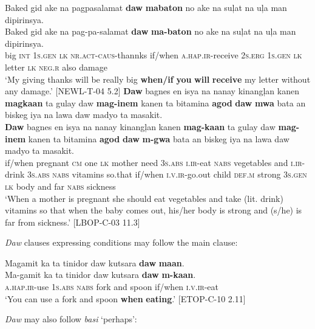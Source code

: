\ea
Baked  gid  ake  na  pagpasalamat  \textbf{daw}  \textbf{mabaton} no  ake  na  suļat  na  uļa  man  dipirinsya. \smallskip\\
\gll Baked  gid  ake  na  pag-pa-salamat  \textbf{daw}  \textbf{ma-baton} no  ake  na  suļat  na  uļa  man  dipirinsya. \\
big  \textsc{int}  1\textsc{s.gen}  \textsc{lk}  \textsc{nr.act}-\textsc{caus}-thannks  if/when  \textsc{a.hap.ir}-receive
2\textsc{s.erg}  1\textsc{s.gen}  \textsc{lk}  letter  \textsc{lk}  \textsc{neg.r}  also  damage \\
\glt `My giving thanks will be really big \textbf{when/if} \textbf{you} \textbf{will} \textbf{receive} my letter without any damage.’ [NEWL-T-04 5.2]
\z
\ea
\textbf{Daw}  bagnes  en  isya  na  nanay  kinangļan  kanen  \textbf{magkaan} ta  gulay  daw  \textbf{mag-inem}  kanen  ta  bitamina  \textbf{agod}  \textbf{daw} \textbf{mwa}  bata  an  biskeg  iya  na  lawa  daw  madyo  ta  masakit. \smallskip\\
\gll \textbf{Daw}  bagnes  en  isya  na  nanay  kinangļan  kanen  \textbf{mag-kaan} ta  gulay  daw  \textbf{mag-inem}  kanen  ta  bitamina  \textbf{agod}  \textbf{daw} \textbf{m-gwa}  bata  an  biskeg  iya  na  lawa  daw  madyo  ta  masakit. \\
if/when  pregnant  \textsc{cm}  one  \textsc{lk}  mother  need  3\textsc{s.abs}  \textsc{i.ir}-eat
\textsc{nabs} vegetables  and  \textsc{i.ir}-drink  3\textsc{s.abs}  \textsc{nabs}  vitamins  so.that  if/when
\textsc{i.v.ir}-go.out  child  \textsc{def.m}  strong  3\textsc{s.gen}  \textsc{lk}  body  and  far  \textsc{nabs} sickness \\
\glt `When a mother is pregnant she should eat vegetables and take (lit. drink) vitamins so that when the baby comes out, his/her body is strong and (s/he) is far from sickness.’ [LBOP-C-03 11.3]
\z

\textit{Daw} clauses expressing conditions may follow the main clause:

\ea
Magamit  ka  ta  tinidor  daw  kutsara  \textbf{daw}  \textbf{maan}. \smallskip\\
\gll Ma-gamit  ka  ta  tinidor  daw  kutsara  \textbf{daw}  \textbf{m-kaan}. \\
\textsc{a.hap.ir}-use  1\textsc{s.abs}  \textsc{nabs}  fork  and  spoon  if/when  \textsc{i.v.ir}-eat \\
\glt ‘You can use a fork and spoon \textbf{when} \textbf{eating}.’ [ETOP-C-10 2.11]
\z

\textit{Daw} may also follow \textit{basi} ‘perhaps’:

